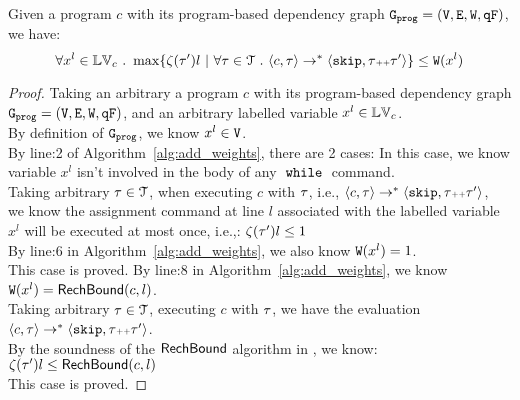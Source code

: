 
{
  \begin{thm}
    \label{thm:addweight_soundness}
  Given a program ${c}$ with its program-based dependency graph $\mathtt{{G_{prog}}} = (\mathtt{V}, \mathtt{E}, \mathtt{W}, \mathtt{qF})$, we have:
  \[
  \forall x^l \in \lvar_c \st 
  \max \left\{ \vcounter(\vtrace') l ~ \middle\vert~
  \forall \vtrace \in \mathcal{T} \st \config{{c}, \trace} \to^{*} \config{\eskip, \trace\tracecat\vtrace'} \right\} 
  \leq 
  \weights(x^l)
  \]
  \end{thm}
}
\begin{proof}
  Taking an arbitrary a program ${c}$ with its program-based dependency graph $\mathtt{{G_{prog}}} = (\mathtt{V}, \mathtt{E}, \mathtt{W}, \mathtt{qF})$, and an arbitrary labelled variable $x^l \in \mathbb{LV}_c$.
  \\
  By definition of $\mathtt{{G_{prog}}}$, we know $ x^l \in \mathtt{V}$. 
  \\
  By line:2 of Algorithm~\ref{alg:add_weights}, there are 2 cases:
  In this case, we know variable $x^l$ isn't involved in the body of any $\;\mathtt{while}\;$ command. 
  \\
  Taking arbitrary $\mathtt{\tau} \in \mathcal{T}$, when executing $c$ with $\mathtt{\tau}$, i.e., $\langle {c}, \mathtt{\tau} \rangle \to^{*} \langle \mathtt{skip}, \mathtt{\tau}{\scriptscriptstyle ++}\mathtt{\tau}' \rangle$,
  \\
  we know the
  assignment command at line $l$ associated with the labelled variable $x^l$ will be executed at most once, i.e.,:
  $\mathtt{\zeta}(\mathtt{\tau}') l \leq 1$
  \\
  By line:6 in Algorithm~\ref{alg:add_weights}, we also know $\mathtt{W}(x^l) = 1$.
  \\
  This case is proved.
  By line:8 in Algorithm~\ref{alg:add_weights}, we know  $\mathtt{W}(x^l) = \mathsf{RechBound}(c, l)$.
  \\
  Taking arbitrary $\mathtt{\tau} \in \mathcal{T}$, executing $c$ with $\mathtt{\tau}$, we have the evaluation $\langle {c}, \mathtt{\tau} \rangle \to^{*} \langle \mathtt{skip}, \mathtt{\tau}{\scriptscriptstyle ++}\mathtt{\tau}' \rangle$.
  \\
  By the soundness of the $\mathsf{RechBound}$ algorithm in \cite{Sumit2010rechability}, we know:
$\mathtt{\zeta}(\mathtt{\tau}') l \leq \mathsf{RechBound}(c, l)$
\\
This case is proved.
\end{proof}

